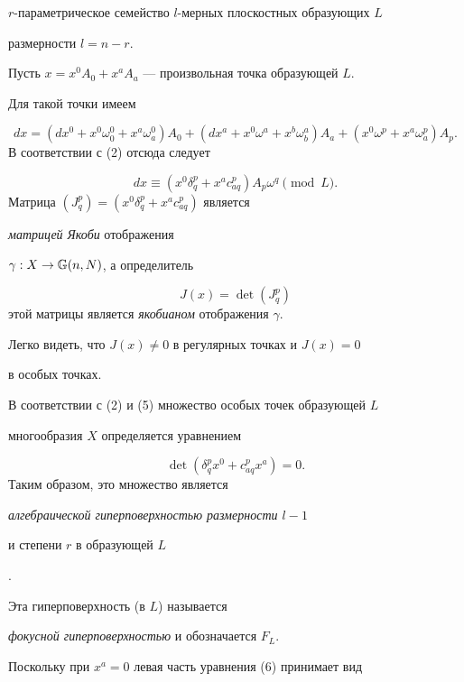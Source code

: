$r$-параметрическое семейство $l$-мерных плоскостных образующих $L$


размерности $l = n - r$.


Пусть $x = x^0 A_0 + x^a A_a$ --- произвольная точка образующей $L$.


Для такой точки имеем


$$
d x = (dx^0 + x^0 \omega_0^0 + x^a \omega_a^0) A_0 + (dx^a + x^0
\omega^a + x^b \omega_b^a) A_a + (x^0 \omega^p + x^a \omega_a^p)A_p.
$$
В соответствии с (2) отсюда следует


\begin{equation}


\label{eq:11}


d x \equiv (x^0 \delta_q^p + x^a c^p_{aq}) A_p \omega^q \pmod{L}.
\end{equation}
Матрица $(J^p_q) = (x^0 \delta_q^p + x^a c^p_{aq})$ является


{\em матрицей Якоби} отображения


$\gamma: X \rightarrow \Bbb{G} (n, N)$, а опре\-делитель


$$


J (x) = \det (J^p_q )


$$
этой матрицы является {\em якобианом} отображения $\gamma$.


Легко видеть, что $J (x) \neq 0$ в регулярных точках и $J(x) = 0$


в особых точках.



В соответствии с (2) и (5) множество особых точек образующей $L$


многообразия $X$ определяется уравнением


\begin{equation}


\label{eq:12}


\det (\delta_q^p x^0 + c^p_{aq} x^a) = 0.
\end{equation}
 Таким образом, это множество является


{\em алгебраической гиперповерхностью размерности $l- 1$


и степени $r$ в образующей $L$}.


Эта гиперповерхность (в $L$) называется


{\em фокусной гиперповерхностью} и обозначается $F_L$.





Поскольку при $x^a = 0$ левая часть уравнения (6) принимает вид


